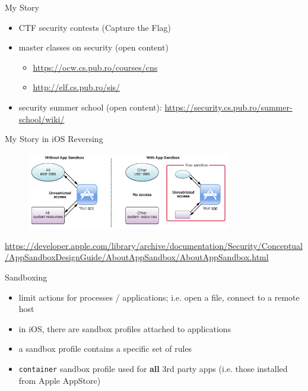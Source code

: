 \documentclass{simple}
\begin{document}
\begin{frame}{My Story}
  \begin{itemize}
    \pause \item CTF security contests (Capture the Flag)
    \pause \item master classes on security (open content)
      \begin{itemize}
        \pause \item \url{https://ocw.cs.pub.ro/courses/cns}
        \pause \item \url{http://elf.cs.pub.ro/sis/}
      \end{itemize}
    \pause \item security summer school (open content): \url{https://security.cs.pub.ro/summer-school/wiki/}
  \end{itemize}
\end{frame}

\begin{frame}{My Story in iOS Reversing}
  \begin{figure}
    \centering
    \includegraphics[width=0.8\textwidth]{img/ios-sandboxing}
  \end{figure}
  \begin{center}
    \tiny
    \url{https://developer.apple.com/library/archive/documentation/Security/Conceptual/AppSandboxDesignGuide/AboutAppSandbox/AboutAppSandbox.html}
  \end{center}
\end{frame}

\begin{frame}{Sandboxing}
  \begin{itemize}
    \pause \item limit actions for processes / applications; i.e. open a file, connect to a remote host
    \pause \item in iOS, there are sandbox profiles attached to applications
    \pause \item a sandbox profile contains a specific set of rules
    \pause \item \texttt{container} sandbox profile used for \textbf{all} 3rd party apps (i.e. those installed from Apple AppStore)
  \end{itemize}
\end{frame}
\end{document}
